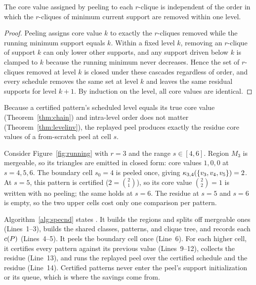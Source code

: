 \begin{theorem}
\label{thm:levelinv}
The core value assigned by peeling to each $r$-clique is independent of the order in which the $r$-cliques of minimum current support are removed within one level.
\end{theorem}
\begin{proof}
Peeling assigns core value $k$ to exactly the $r$-cliques removed while the running minimum support equals $k$.
%
Within a fixed level $k$, removing an $r$-clique of support $k$ can only lower other supports, and any support driven below $k$ is clamped to $k$ because the running minimum never decreases.
%
Hence the set of $r$-cliques removed at level $k$ is closed under these cascades regardless of order, and every schedule removes the same set at level $k$ and leaves the same residual supports for level $k{+}1$.
%
By induction on the level, all core values are identical.
\end{proof}

Because a certified pattern's scheduled level equals its true core value (Theorem~\ref{thm:chain}) and intra-level order does not matter (Theorem~\ref{thm:levelinv}), the replayed peel produces exactly the residue core values of a from-scratch peel at cell $s$.

\begin{example}
\label{exa:sweep}
Consider Figure~\ref{fig:running} with $r{=}3$ and the range $s\in[4,6]$.
%
Region $M_3$ is mergeable, so its triangles are emitted in closed form: core values $1,0,0$ at $s{=}4,5,6$.
%
The boundary cell $s_0{=}4$ is peeled once, giving $\kappa_{3,4}(\{v_3,v_4,v_5\})=2$.
%
At $s{=}5$, this pattern is certified ($2=\binom{2}{1}$), so its core value $\binom{2}{2}=1$ is written with no peeling; the same holds at $s{=}6$.
%
The residue at $s{=}5$ and $s{=}6$ is empty, so the two upper cells cost only one comparison per pattern.
\end{example}

Algorithm~\ref{alg:specnd} states \specnd.
%
It builds the regions and splits off mergeable ones (Lines~1--3), builds the shared classes, patterns, and clique tree, and records each $c(P)$ (Lines~4--5).
%
It peels the boundary cell once (Line~6).
%
For each higher cell, it certifies every pattern against its previous value (Lines~9--12), collects the residue (Line~13), and runs the replayed peel over the certified schedule and the residue (Line~14).
%
Certified patterns never enter the peel's support initialization or its queue, which is where the savings come from.

